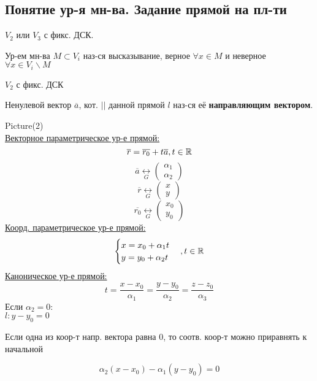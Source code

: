 \subsection{Понятие ур-я мн-ва. Задание прямой на пл-ти}
$V_2$ или $V_3$ с фикс. ДСК.
\begin{definition}
Ур-ем мн-ва $M \subset V_i$ наз-ся высказывание, верное $\forall x \in M$ и неверное $\forall x \in V_i \backslash M$
\end{definition}
$V_2$ с фикс. ДСК
\begin{definition}
Ненулевой вектор $\overline{a}$, кот. $||$ данной прямой $l$ наз-ся её \textbf{направляющим вектором}.
\end{definition}
Picture(2) \\
\underline{Векторное параметрическое ур-е прямой:}
\begin{equation}
\overline{r} = \overline{r_0} + t \overline{a}, t \in \mathbb{R} \\
\end{equation}
\[
\overline{a} \underset{G}{\longleftrightarrow} \begin{pmatrix}\alpha_1 \\ \alpha_2 \end{pmatrix}
\]
\[
\overline{r} \underset{G}{\longleftrightarrow} \begin{pmatrix}x \\ y \end{pmatrix}
\]
\[
\overline{r_0} \underset{G}{\longleftrightarrow} \begin{pmatrix}x_0 \\ y_0 \end{pmatrix}
\]
\underline{Коорд. параметрическое ур-е прямой:}
\begin{equation}
\begin{cases}
x = x_0 + \alpha_1 t \\
y = y_0 + \alpha_2 t
\end{cases}, t \in \mathbb{R}
\end{equation}
\underline{Каноническое ур-е прямой:}
\begin{equation}
t = \frac{x - x_0}{\alpha_1} = \frac{y - y_0}{\alpha_2} = \frac{z - z_0}{\alpha_3}
\end{equation}
Если $\alpha_2 = 0$: \\
$l\colon y - y_0 = 0$
\begin{note}
Если одна из коор-т напр. вектора равна 0, то соотв. коор-т можно приравнять к начальной
\end{note}
\[
\alpha_2 (x - x_0) - \alpha_1(y - y_0) = 0
\]
